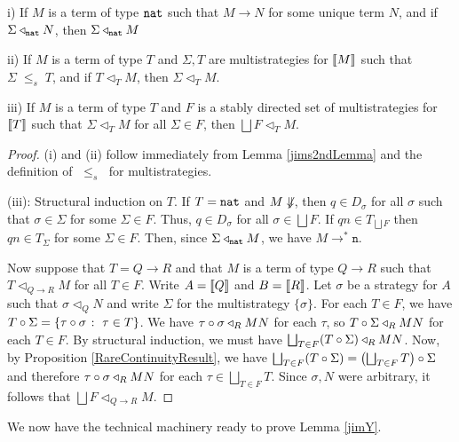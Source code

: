 \documentclass{entcs} \usepackage{prentcsmacro}
\newcommand{\stle}{{\;\le_s\;}}
\newcommand{\exlub}{\bigsqcup}
\newcommand{\opto}{\longrightarrow}
\newcommand{\n}{{\mathtt{n}}}
\newcommand{\0}{{\mathtt{0}}}
\newcommand{\plot}{\triangleleft}
\newcommand{\Tau}{T}
\begin{document}
\begin{lemma}
  \label{multijims2ndLemma}
  i) If $M$ is a term of type ${\mathtt{nat}}$ such that $M\opto N$ for some unique term $N$, and if $\Sigma\plot_\nat N$, then $\Sigma\plot_\nat M$

  ii) If $M$ is a term of type $T$ and $\Sigma,\Tau$ are multistrategies for $\left\llbracket M\right\rrbracket$ such that $\Sigma\stle\Tau$, and if $\Tau\plot_TM$, then $\Sigma\plot_TM$.

  iii) If $M$ is a term of type $T$ and $F$ is a stably directed set of multistrategies for $\left\llbracket T\right\rrbracket$ such that $\Sigma\plot_TM$ for all $\Sigma\in F$, then $\exlub F\plot_TM$.
\end{lemma}
\begin{proof}
  (i) and (ii) follow immediately from Lemma \ref{jims2ndLemma} and the definition of $\stle$ for multistrategies.

  (iii): Structural induction on $T$.  If $T={\mathtt{nat}}$ and $M\not\Downarrow$, then $q\in D_\sigma$ for all $\sigma$ such that $\sigma\in\Sigma$ for some $\Sigma\in F$.  Thus, $q\in D_\sigma$ for all $\sigma\in\exlub F$.  If $qn\in T_{\exlub F}$ then $qn\in T_\Sigma$ for some $\Sigma\in F$.  Then, since $\Sigma\plot_\nat M$, we have $M\opto^*\n$.  

  Now suppose that $T=Q\to R$ and that $M$ is a term of type $Q\to R$ such that $\Tau\plot_{Q\to R}M$ for all $\Tau\in F$.  Write $A=\left\llbracket Q\right\rrbracket$ and $B=\left\llbracket R\right\rrbracket$.  Let $\sigma$ be a strategy for $A$ such that $\sigma\plot_QN$ and write $\Sigma$ for the multistrategy $\{\sigma\}$.  For each $\Tau\in F$, we have $\icomp\Tau\Sigma = \{\icomp\tau\sigma\suchthat\tau\in\Tau\}$.  We have $\icomp\tau\sigma\plot_RMN$ for each $\tau$, so $\icomp\Tau\Sigma\plot_RMN$ for each $\Tau\in F$.  By structural induction, we must have $\exlub_{\Tau\in F}(\icomp\Tau\Sigma)\plot_RMN$.  Now, by Proposition \ref{RareContinuityResult}, we have $\exlub_{\Tau\in F}(\icomp\Tau\Sigma)=\icomp{\left(\exlub_{\Tau\in F}\Tau\right)}\Sigma$ and therefore $\icomp\tau\sigma\plot_RMN$ for each $\tau\in\exlub_{\Tau\in F}\Tau$.  Since $\sigma, N$ were arbitrary, it follows that $\exlub F\plot_{Q\to R}M$.  
\end{proof}

We now have the technical machinery ready to prove Lemma \ref{jimY}.
\end{document}
